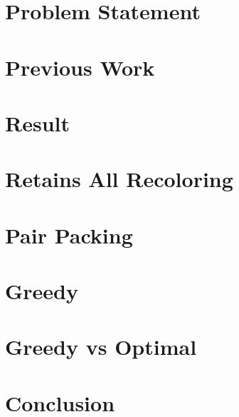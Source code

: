 \documentclass{beamer}
\author{Gilad Kutiel}
\begin{document}


\section{Problem Statement}



\section{Previous Work}


\section{Result}


\section{Retains All Recoloring}






\section{Pair Packing}





\section{Greedy}





\section{Greedy vs Optimal}








\section{Conclusion}

\end{document}
